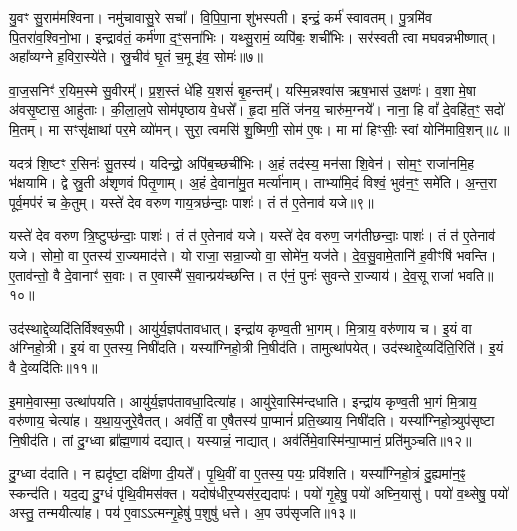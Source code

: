 यु॒वꣳ सु॒राम॑मश्विना।
नमु॑चावासु॒रे सचा᳚।
वि॒पि॒पा॒ना शु॑भस्पती।
इन्द्रं॒ कर्म॑ स्वावतम्।
पु॒त्रमि॑व पि॒तरा॑व॒श्विनो॒भा।
इन्द्राव॑तं॒ कर्म॑णा द॒ꣳ॒सना॑भिः।
यथ्सु॒रामं॒ व्यपि॑बः॒ शची॑भिः।
सर॑स्वती त्वा मघवन्नभीष्णात्।
अहा᳚व्यग्ने ह॒विरा॒स्ये॑ते।
स्रु॒चीव॑ घृ॒तं च॒मू इ॑व॒ सोमः॑॥७॥

वा॒ज॒सनिꣳ॑ र॒यिम॒स्मे सु॒वीरम्᳚।
प्र॒श॒स्तं धे॑हि य॒शसं॑ बृ॒हन्तम्᳚।
यस्मि॒न्नश्वा॑स ऋष॒भास॑ उ॒क्षणः॑।
व॒शा मे॒षा अ॑वसृ॒ष्टास॒ आहु॑ताः।
की॒ला॒ल॒पे सोम॑पृष्ठाय वे॒धसे᳚।
हृ॒दा म॒तिं ज॑नय॒ चारु॑म॒ग्नये᳚।
नाना॒ हि वां᳚ दे॒वहि॑त॒ꣳ॒ सदो॑ मि॒तम्।
मा सꣳसृ॑क्षाथां पर॒मे व्यो॑मन्।
सुरा॒ त्वमसि॑ शु॒ष्मिणी॒ सोम॑ ए॒षः।
मा मा॑ हिꣳसीः॒ स्वां योनि॑मावि॒शन्॥८॥

यदत्र॑ शि॒ष्टꣳ र॒सिनः॑ सु॒तस्य॑।
यदिन्द्रो॒ अपि॑ब॒च्छची॑भिः।
अ॒हं तद॑स्य॒ मन॑सा शि॒वेन॑।
सोम॒ꣳ॒ राजा॑नमि॒ह भ॑क्षयामि।
द्वे स्रु॒ती अ॑शृणवं पितृ॒णाम्।
अ॒हं दे॒वाना॑मु॒त मर्त्या॑नाम्।
ताभ्या॑मि॒दं विश्वं॒ भुव॑न॒ꣳ॒ समे॑ति।
अ॒न्त॒रा पूर्व॒मप॑रं च के॒तुम्।
यस्ते॑ देव वरुण गाय॒त्रछ॑न्दाः॒ पाशः॑।
तं त॑ ए॒तेनाव॑ यजे॥९॥

यस्ते॑ देव वरुण त्रि॒ष्टुप्छ॑न्दाः॒ पाशः॑।
तं त॑ ए॒तेनाव॑ यजे।
यस्ते॑ देव वरुण॒ जग॑तीछन्दाः॒ पाशः॑।
तं त॑ ए॒तेनाव॑ यजे।
सोमो॒ वा ए॒तस्य॑ रा॒ज्यमाद॑त्ते।
यो राजा॒ सन्रा॒ज्यो वा॒ सोमे॑न॒ यज॑ते।
दे॒व॒सु॒वामे॒तानि॑ ह॒वीꣳषि॑ भवन्ति।
ए॒ताव॑न्तो॒ वै दे॒वानाꣳ॑ स॒वाः।
त ए॒वास्मै॑ स॒वान्प्रय॑च्छन्ति।
त ए॑नं॒ पुनः॑ सुवन्ते रा॒ज्याय॑।
दे॒व॒सू राजा॑ भवति॥१०॥\anuvakamend[सोम॑ आवि॒शन् य॑जे रा॒ज्यायैकं॑ च]

उद॑स्थाद्दे॒व्यदि॑तिर्विश्वरू॒पी।
आयु॑र्य॒ज्ञप॑तावधात्।
इन्द्रा॑य कृण्व॒ती भा॒गम्।
मि॒त्राय॒ वरु॑णाय च।
इ॒यं वा अ॑ग्निहो॒त्री।
इ॒यं वा ए॒तस्य॒ निषी॑दति।
यस्या᳚ग्निहो॒त्री नि॒षीद॑ति।
तामुत्था॑पयेत्।
उद॑स्थाद्दे॒व्यदि॑ति॒रिति॑।
इ॒यं वै दे॒व्यदि॑तिः॥११॥

इ॒मामे॒वास्मा॒ उत्था॑पयति।
आयु॑र्य॒ज्ञप॑तावधा॒दित्या॑ह।
आयु॑रे॒वा\-स्मि॑न्दधाति।
इन्द्रा॑य कृण्व॒ती भा॒गं मि॒त्राय॒ वरु॑णाय॒ चेत्या॑ह।
य॒था॒\-य॒जु\-रे॒वै\-तत्।
अव॑र्तिं॒ वा ए॒षैतस्य॑ पा॒प्मानं॑ प्रति॒ख्याय॒ निषी॑दति।
यस्या᳚ग्निहो॒त्र्युप॑सृष्टा नि॒षीद॑ति।
तां दु॒ग्ध्वा ब्रा᳚ह्म॒णाय॑ दद्यात्।
यस्यान्नं॒ नाद्यात्।
अव॑र्तिमे॒वास्मि॑न्पा॒प्मानं॒ प्रति॑\-मुञ्चति॥१२॥

दु॒ग्ध्वा द॑दाति।
न ह्यदृ॑ष्टा॒ दक्षि॑णा दी॒यते᳚।
पृ॒थि॒वीं वा ए॒तस्य॒ पयः॒ प्रवि॑शति।
यस्या᳚ग्निहो॒त्रं दु॒ह्यमा॑न॒ꣴ॒ स्कन्द॑ति।
यद॒द्य दु॒ग्धं पृ॑थि॒वीमस॑क्त।
यदोष॑धीर॒प्यस॑र॒द्यदापः॑।
पयो॑ गृ॒हेषु॒ पयो॑ अघ्नि॒यासु॑।
पयो॑ व॒थ्सेषु॒ पयो॑ अस्तु॒ तन्मयीत्या॑ह।
पय॑ ए॒वाऽऽत्मन्गृ॒हेषु॑ प॒शुषु॑ धत्ते।
अ॒प उप॑\-सृजति॥१३॥

